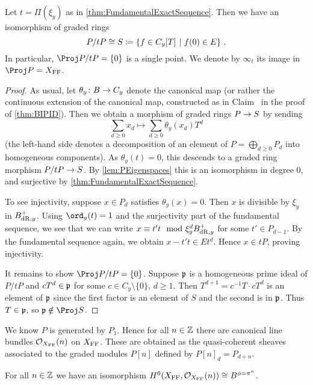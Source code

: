 \begin{cor}\label{cor:P/tPpoint}
	Let $t=\Pi(\xi_y)$ as in \cref{thm:FundamentalExactSequence}. Then we have an isomorphism of graded rings
	\begin{equation*}
		P/tP\cong S\coloneqq\left\{f\in C_y[T]\ \middle|\  f(0)\in E\right\}\,.
	\end{equation*}
	In particular, $\Proj P/tP=\{0\}$ is a single point. We denote by $\infty_t$ its image in $\Proj P=X_\FFC$.
\end{cor}
\begin{proof}
	As usual, let $\theta_y\colon B\morphism C_y$ denote the canonical map (or rather the continuous extension of the canonical map, constructed as in Claim~ in the proof of \cref{thm:BIPID}). Then we obtain a morphism of graded rings $P\morphism S$ by sending
	\begin{equation*}
		\sum_{d\geq 0}x_d\longmapsto \sum_{d\geq 0}\theta_y(x_d)T^d
	\end{equation*}
	(the left-hand side denotes a decomposition of an element of $P=\bigoplus_{d\geq 0}P_d$ into homogeneous components). As $\theta_y(t)=0$, this descends to a graded ring morphism $P/tP\morphism S$. By \cref{lem:PEigenspaces} this is an isomorphism in degree $0$, and surjective by \cref{thm:FundamentalExactSequence}.
	
	To see injectivity, suppose $x\in P_d$ satisfies $\theta_y(x)=0$. Then $x$ is divisible by $\xi_y$ in $B_{\mathrm{dR},y}^+$. Using $\ord_y(t)=1$ and the surjectivity part of the fundamental sequence, we see that we can write $x\equiv t't\mod \xi_y^dB_{\mathrm{dR},y}^+$ for some $t'\in P_{d-1}$. By the fundamental sequence again, we obtain $x-t't\in Et^d$. Hence $x\in tP$, proving injectivity.
	
	It remains to show $\Proj P/tP=\{0\}$. Suppose $\mathfrak{p}$ is a homogeneous prime ideal of $P/tP$ and $cT^d\in \mathfrak{p}$ for some $c\in C_y\setminus\{0\}$, $d\geq 1$. Then $T^{d+1}=c^{-1}T\cdot cT^d$ is an element of $\mathfrak{p}$ since the first factor is an element of $S$ and the second is in $\mathfrak{p}$. Thus $T\in \mathfrak{p}$, so $\pp\notin \Proj S$.
\end{proof}
We know $P$ is generated by $P_1$. Hence for all $n\in \mathbb{Z}$ there are canonical line bundles $\mathcal{O}_{X_{\mathrm{FF}}}(n)$ on $X_{\mathrm{FF}}$. These are obtained as the quasi-coherent sheaves associated to the graded modules $P[n]$ defined by $P[n]_d=P_{d+n}$.
\begin{lem}\label{lem:HiOXn}
	For all $n\in \mathbb{Z}$ we have an isomorphism $H^0(X_\FFC,\Oo_{X_\FFC}(n))\cong B^{\phi=\pi^n}$.
\end{lem}
